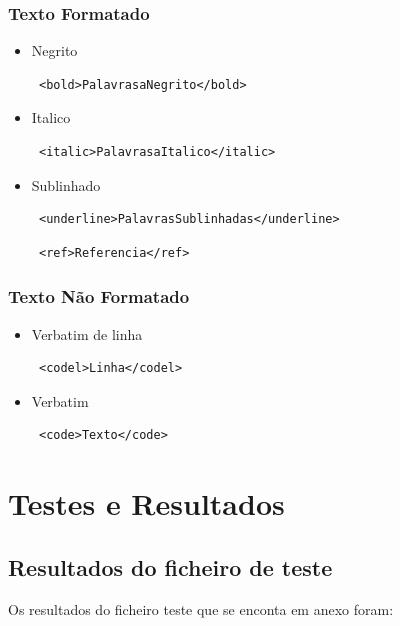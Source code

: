 \documentclass{report}
\begin{document}
\subsection{Texto Formatado}
\begin{itemize}
\item Negrito 
\begin{verbatim} <bold>PalavrasaNegrito</bold>  \end{verbatim}
\item Italico
\begin{verbatim} <italic>PalavrasaItalico</italic> \end{verbatim}
\item Sublinhado
\begin{verbatim} <underline>PalavrasSublinhadas</underline> \end{verbatim}


\begin{verbatim} <ref>Referencia</ref> \end{verbatim}

\end{itemize}

\subsection{Texto Não Formatado}
\begin{itemize}
\item Verbatim de linha
\begin{verbatim} <codel>Linha</codel> \end{verbatim}
\item Verbatim
\begin{verbatim} <code>Texto</code> \end{verbatim}
\end{itemize}
\chapter{Testes e Resultados}

\section{Resultados do ficheiro de teste}
Os resultados do ficheiro teste que se enconta em anexo foram:
\end{document}
